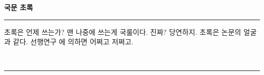 
\begin{center}{\Large\textbf{국문 초록}} \noindent\rule{\textwidth}{.12mm} \end{center}
초록은 언제 쓰는가? 맨 나중에 쓰는게 국룰이다. 진짜? 당연하지. 초록은 논문의 얼굴과 같다. 선행연구 \citep{smith1987tiling}에 의하면 어쩌고 저쩌고.


\vskip5pt
\ \mykeywordsko %

\noindent\rule{\textwidth}{.12mm}
